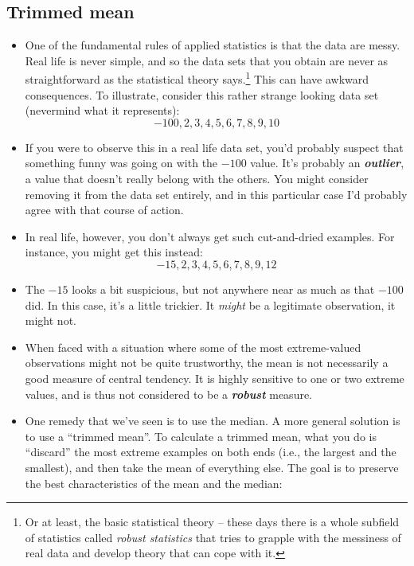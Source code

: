 \documentclass[
]{book}
\begin{document}
\subsection{Trimmed mean}\label{trimmedmean}

\begin{itemize}
\item
  One of the fundamental rules of applied statistics is that the data are messy. Real life is never simple, and so the data sets that you obtain are never as straightforward as the statistical theory says.\footnote{Or at least, the basic statistical theory -- these days there is a whole subfield of statistics called \emph{robust statistics} that tries to grapple with the messiness of real data and develop theory that can cope with it.} This can have awkward consequences. To illustrate, consider this rather strange looking data set (nevermind what it represents):
  \[
  -100,2,3,4,5,6,7,8,9,10
  \]
\item
  If you were to observe this in a real life data set, you'd probably suspect that something funny was going on with the \(-100\) value. It's probably an \textbf{\emph{outlier}}, a value that doesn't really belong with the others. You might consider removing it from the data set entirely, and in this particular case I'd probably agree with that course of action.
\item
  In real life, however, you don't always get such cut-and-dried examples. For instance, you might get this instead:
  \[
  -15,2,3,4,5,6,7,8,9,12
  \]
\item
  The \(-15\) looks a bit suspicious, but not anywhere near as much as that \(-100\) did. In this case, it's a little trickier. It \emph{might} be a legitimate observation, it might not.
\item
  When faced with a situation where some of the most extreme-valued observations might not be quite trustworthy, the mean is not necessarily a good measure of central tendency. It is highly sensitive to one or two extreme values, and is thus not considered to be a \textbf{\emph{robust}} measure.
\item
  One remedy that we've seen is to use the median. A more general solution is to use a ``trimmed mean''. To calculate a trimmed mean, what you do is ``discard'' the most extreme examples on both ends (i.e., the largest and the smallest), and then take the mean of everything else. The goal is to preserve the best characteristics of the mean and the median:


\end{itemize}
\end{document}
